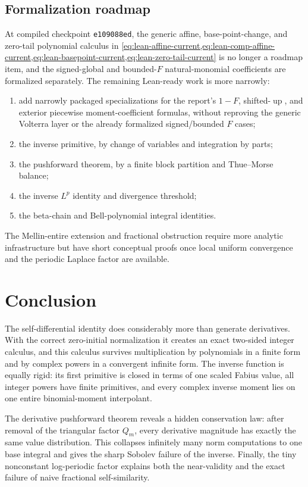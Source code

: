 \documentclass[11pt]{article}
\theoremstyle{definition}
\theoremstyle{remark}
\DeclareMathOperator{\upf}{up}
\begin{document}
\subsection{Formalization roadmap}

At compiled checkpoint \texttt{e109088ed}, the generic affine, base-point-change, and
zero-tail polynomial calculus in
\cref{eq:lean-affine-current,eq:lean-comp-affine-current,eq:lean-basepoint-current,eq:lean-zero-tail-current}
is no longer a roadmap item, and the signed-global and bounded-\(F\) natural-monomial
coefficients are formalized separately.  The remaining Lean-ready work is more narrowly:
\begin{enumerate}
  \item add narrowly packaged specializations for the report's \(1-F\), shifted-\(\upf\),
        and exterior piecewise moment-coefficient formulas, without reproving the generic
        Volterra layer or the already formalized signed/bounded \(F\) cases;
  \item the inverse primitive, by change of variables and integration by parts;
  \item the pushforward theorem, by a finite block partition and Thue--Morse balance;
  \item the inverse \(L^p\) identity and divergence threshold;
  \item the beta-chain and Bell-polynomial integral identities.
\end{enumerate}
The Mellin-entire extension and fractional obstruction require more analytic
infrastructure but have short conceptual proofs once local uniform convergence and the
periodic Laplace factor are available.

\section{Conclusion}

The self-differential identity does considerably more than generate derivatives.  With
the correct zero-initial normalization it creates an exact two-sided integer calculus,
and this calculus survives multiplication by polynomials in a finite form and by complex
powers in a convergent infinite form.  The inverse function is equally rigid: its first
primitive is closed in terms of one scaled Fabius value, all integer powers have finite
primitives, and every complex inverse moment lies on one entire binomial-moment
interpolant.

The derivative pushforward theorem reveals a hidden conservation law: after removal of
the triangular factor \(Q_m\), every derivative magnitude has exactly the same value
distribution.  This collapses infinitely many norm computations to one base integral
and gives the sharp Sobolev failure of the inverse.  Finally, the tiny nonconstant
log-periodic factor explains both the near-validity and the exact failure of naive
fractional self-similarity.
\end{document}
